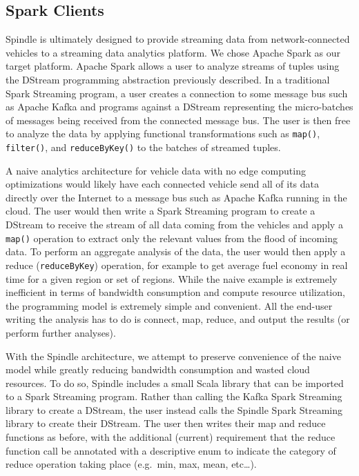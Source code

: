 \documentclass{thesis}
\begin{document}
\subsection{Spark Clients}
    Spindle is ultimately designed to provide streaming data from network-connected vehicles to a streaming data
    analytics platform. We chose Apache Spark as our target platform. Apache Spark allows a user to analyze
    streams of tuples using the DStream programming abstraction previously described. In a traditional Spark
    Streaming program, a user creates a connection to some message bus such as Apache Kafka and programs against
    a DStream representing the micro-batches of messages being received from the connected message bus. The user
    is then free to analyze the data by applying functional transformations such as \verb|map()|, \verb|filter()|, and \verb|reduceByKey()|
    to the batches of streamed tuples. 
    
    A naive analytics architecture for vehicle data with no edge computing optimizations
    would likely have each connected vehicle send all of its data directly over the Internet to a message bus such as
    Apache Kafka running in the cloud. The user would then write a Spark Streaming program to create a DStream
    to receive the stream of all data coming from the vehicles and apply a \verb|map()| operation to extract only the 
    relevant values from the flood of incoming data. To perform an aggregate analysis of the data, the user would then
    apply a reduce (\verb|reduceByKey|) operation, for example to get average fuel economy in real time for a given region or set of
    regions. While the naive example is extremely inefficient in terms of bandwidth consumption and compute resource
    utilization, the programming model is extremely simple and convenient. All the end-user writing the analysis
    has to do is connect, map, reduce, and output the results (or perform further analyses). 

    With the Spindle architecture, we attempt to preserve convenience of the naive model while greatly reducing
    bandwidth consumption and wasted cloud resources. To do so, Spindle includes a small Scala library that can be
    imported to a Spark Streaming program. Rather than calling the Kafka Spark Streaming library to create a 
    DStream, the user instead calls the Spindle Spark Streaming library to create their DStream. The user then
    writes their map and reduce functions as before, with the additional (current) requirement that the reduce function
    call be annotated with a descriptive enum to indicate the category of reduce operation taking place (e.g.\ min,
    max, mean, etc\dots).%
\end{document}

